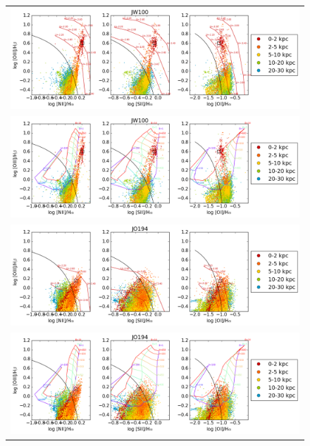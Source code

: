 \documentclass[fleqn,usenatbib]{mnras}
\begin{document}
\begin{figure}
	\begin{tabular}{c}
		\includegraphics[width=.8\linewidth]{Plots/JW100_vo_dist_NLR.png}\\
		\includegraphics[width=.8\linewidth]{Plots/JW100_vo_dist_SH_n1_R_tot.png}\\
		\includegraphics[width=.8\linewidth]{Plots/JO194_vo_dist_NLR.png}\\
\includegraphics[width=.8\linewidth]{Plots/JO194_vo_dist_SH_n1_R_tot.png}\\
	\end{tabular} 
	\contcaption{}
\end{figure}
\end{document}
